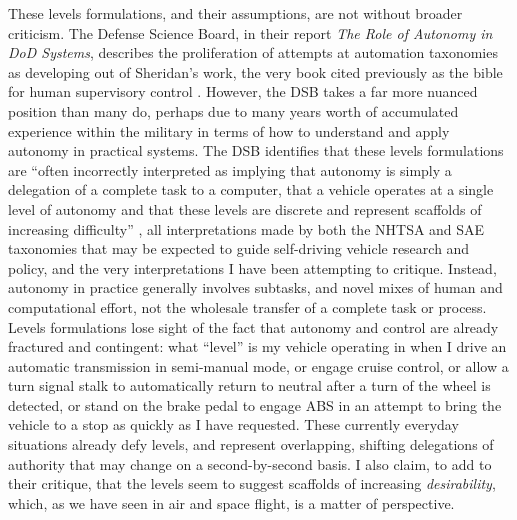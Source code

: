 
These levels formulations, and their assumptions, are not without
broader criticism. The Defense Science Board, in their report
\emph{The Role of 
Autonomy in DoD Systems}, describes the proliferation of attempts at
automation taxonomies as developing out of Sheridan's work, the very
book cited previously as the bible for human supervisory control \cite[p. 23]{DSB}.
However, the DSB takes a far more nuanced position than many do,
perhaps due to many years worth of accumulated experience within the
military in terms of how to understand and apply autonomy in practical
systems. The DSB
identifies that these levels formulations are ``often incorrectly
interpreted as implying that autonomy is simply a delegation of a
complete task to a computer, that a vehicle operates at a single level
of autonomy and that these levels are discrete and represent scaffolds
of increasing difficulty'' \cite[p. 23-24]{DSB}, all interpretations
made by both the 
NHTSA and SAE taxonomies that may be expected to guide self-driving
vehicle research and policy, and the very interpretations I have been
attempting to critique. Instead, autonomy in practice generally
involves subtasks, and novel mixes of human and computational effort,
not the wholesale transfer of a complete task or process. Levels
formulations lose sight of the fact that autonomy and control are
already fractured and contingent:  what ``level'' is my vehicle
operating in when I drive an automatic transmission in semi-manual
mode, or engage cruise control, or allow a turn signal stalk to
automatically return to neutral after a turn of the wheel is detected,
or stand on the brake pedal to engage ABS in an attempt to bring the
vehicle to a stop as quickly as I have requested. These currently
everyday situations already defy levels, and represent overlapping, shifting
delegations of authority that may change on a second-by-second basis.
I also claim, to add to their critique, that the
levels seem to suggest scaffolds of increasing \emph{desirability},
which, as we have seen in air and space flight, is a matter of perspective.

